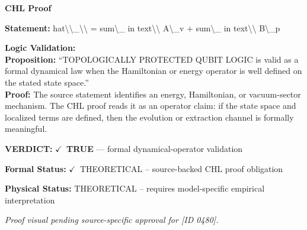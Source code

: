 \vspace{0.45em}
\noindent\textbf{CHL Proof}\par
\textbf{Statement:} hat\textbackslash{}\textbackslash{}\_\textbackslash{}\textbackslash{} = sum\textbackslash{}\_ in text\textbackslash{}\textbackslash{} A\textbackslash{}\_v + sum\textbackslash{}\_ in text\textbackslash{}\textbackslash{} B\textbackslash{}\_p

\textbf{Logic Validation:}\\
\textbf{Proposition:} ``TOPOLOGICALLY PROTECTED QUBIT LOGIC is valid as a formal dynamical law when the
Hamiltonian or energy operator is well defined on the stated state space.''\\
\textbf{Proof:} The source statement identifies an energy, Hamiltonian, or vacuum-sector mechanism. The
CHL proof reads it as an operator claim: if the state space and localized terms are
defined, then the evolution or extraction channel is formally meaningful.

\textbf{VERDICT:} \ensuremath{\checkmark}\ \textbf{TRUE} --- formal dynamical-operator validation

\textbf{Formal Status:} \ensuremath{\checkmark}\ THEORETICAL -- source-backed CHL proof obligation

\textbf{Physical Status:} THEORETICAL -- requires model-specific empirical interpretation
\par\vspace{0.45em}
\par
\vfill
\begingroup\footnotesize\itshape
Proof visual pending source-specific approval for [ID 0480].
\par\endgroup
\vfill
\endgroup
\endgroup
